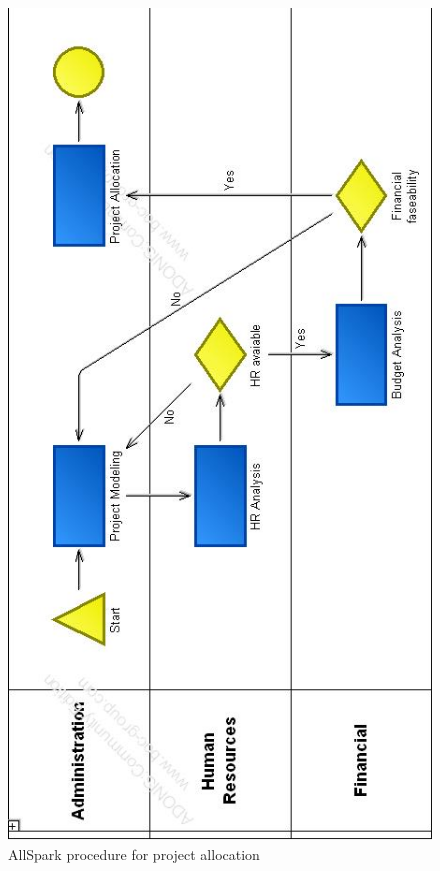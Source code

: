 \begin{figure}
\centering
\includegraphics[scale=0.50]{adonis_diagrams/allocate}
\caption{AllSpark procedure for project allocation}
\label{img:allocate}
\end{figure}

